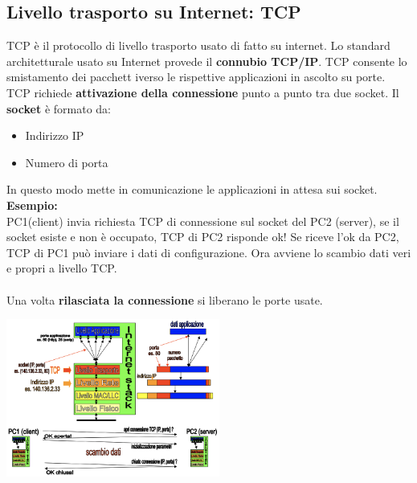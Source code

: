 \documentclass{article}
\begin{document}
\subsection{Livello trasporto su Internet: TCP}
TCP è il protocollo di livello trasporto usato di fatto su internet. Lo standard architetturale usato su Internet provede il \textbf{connubio TCP/IP}. TCP consente lo smistamento dei pacchett iverso le rispettive applicazioni in ascolto su porte.\\
TCP richiede \textbf{attivazione della connessione} punto a punto tra due socket. Il \textbf{socket} è formato da:
\begin{itemize}
    \item Indirizzo IP
    \item Numero di porta
\end{itemize}
In questo modo mette in comunicazione le applicazioni in attesa sui socket.\\
\textbf{Esempio:}\\
PC1(client) invia richiesta TCP di connessione sul socket del PC2 (server), se il socket esiste e non è occupato, TCP di PC2 risponde ok! Se riceve l'ok da PC2, TCP di PC1 può inviare i dati di configurazione. Ora avviene lo scambio dati veri e propri a livello TCP.\\\\
Una volta \textbf{rilasciata la connessione} si liberano le porte usate.
\begin{center}
\includegraphics[width=7cm]{img/connessione.png}
\end{center}
\end{document}

